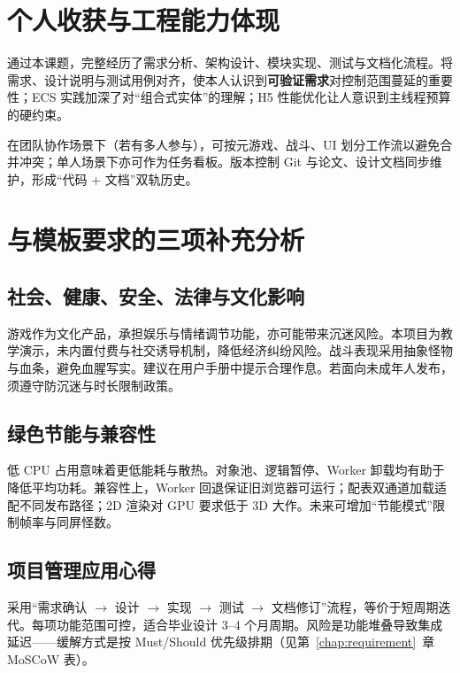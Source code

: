 ﻿
\section{个人收获与工程能力体现}

通过本课题，完整经历了需求分析、架构设计、模块实现、测试与文档化流程。将需求、设计说明与测试用例对齐，使本人认识到\textbf{可验证需求}对控制范围蔓延的重要性；ECS 实践加深了对“组合式实体”的理解；H5 性能优化让人意识到主线程预算的硬约束\cite{munaiah2017github,gregory2018game}。

在团队协作场景下（若有多人参与），可按元游戏、战斗、UI 划分工作流以避免合并冲突；单人场景下亦可作为任务看板。版本控制 Git 与论文、设计文档同步维护，形成“代码 + 文档”双轨历史。

\section{与模板要求的三项补充分析}

\subsection{社会、健康、安全、法律与文化影响}

游戏作为文化产品，承担娱乐与情绪调节功能，亦可能带来沉迷风险\cite{petty2010vv}。本项目为教学演示，未内置付费与社交诱导机制，降低经济纠纷风险。战斗表现采用抽象怪物与血条，避免血腥写实。建议在用户手册中提示合理作息。若面向未成年人发布，须遵守防沉迷与时长限制政策。

\subsection{绿色节能与兼容性}

低 CPU 占用意味着更低能耗与散热\cite{gregory2018game}。对象池、逻辑暂停、Worker 卸载均有助于降低平均功耗。兼容性上，Worker 回退保证旧浏览器可运行；配表双通道加载适配不同发布路径；2D 渲染对 GPU 要求低于 3D 大作。未来可增加“节能模式”限制帧率与同屏怪数。

\subsection{项目管理应用心得}

采用“需求确认 $\rightarrow$ 设计 $\rightarrow$ 实现 $\rightarrow$ 测试 $\rightarrow$ 文档修订”流程，等价于短周期迭代\cite{munaiah2017github}。每项功能范围可控，适合毕业设计 3--4 个月周期。风险是功能堆叠导致集成延迟——缓解方式是按 Must/Should 优先级排期（见第~\ref{chap:requirement}~章 MoSCoW 表）。

